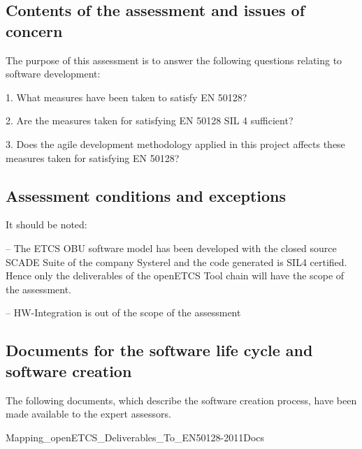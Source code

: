 \bigskip

\subsection{Contents of the assessment and issues of concern}
The purpose of this assessment is to answer the following questions relating to software development:

1. What measures have been taken to satisfy EN 50128?

2. Are the measures taken for satisfying EN 50128 SIL 4 sufficient?

3. Does the agile development methodology applied in this project affects these measures taken for satisfying EN 50128?


\bigskip

\subsection{Assessment conditions and exceptions}
It should be noted:

{}-- The ETCS OBU software model has been developed with the closed source SCADE Suite of the company Systerel and the
code generated is SIL4 certified. Hence only the deliverables of the openETCS Tool chain will have the scope of the
assessment.

{}-- HW-Integration is out of the scope of the assessment

\subsection{Documents for the software life cycle
and software creation}
The following documents, which describe the software creation process, have been made available to the expert assessors.


\bigskip



Mapping\_openETCS\_Deliverables\_To\_EN50128-2011Docs
